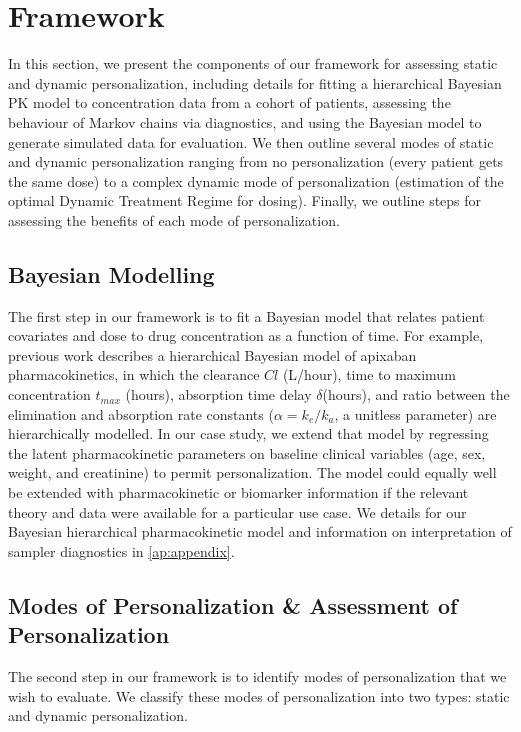 \section{Framework}\label{ss:framework}

In this section, we present the components of our framework for assessing static and dynamic personalization, including details for fitting a hierarchical Bayesian PK model to concentration data from a cohort of patients, assessing the behaviour of Markov chains via diagnostics, and using the Bayesian model to generate simulated data for evaluation. We then outline several modes of static and dynamic personalization ranging from no personalization (every patient gets the same dose) to a complex dynamic mode of personalization (estimation of the optimal Dynamic Treatment Regime for dosing).  Finally, we outline steps for assessing the benefits of each mode of personalization.

\subsection{Bayesian Modelling}

The first step in our framework is to fit a Bayesian model that relates patient covariates and dose to drug concentration as a function of time. For example, previous work \cite{pananos2020comparisons} describes a hierarchical Bayesian model of apixaban pharmacokinetics, in which the clearance $Cl$ (L/hour), time to maximum concentration $t_{max}$ (hours), absorption time delay $\delta$(hours), and ratio between the elimination and absorption rate constants ($\alpha = k_e/k_a$, a unitless parameter) are hierarchically modelled. In our case study, we extend that model by regressing the latent pharmacokinetic parameters on baseline clinical variables (age, sex, weight, and creatinine) to permit personalization. The model could equally well be extended with pharmacokinetic or biomarker information if the relevant theory and data were available for a particular use case. We details for our Bayesian hierarchical pharmacokinetic model and information on interpretation of sampler diagnostics in \cref{ap:appendix}.


\subsection{Modes of Personalization \& Assessment of Personalization}

The second step in our framework is to identify modes of personalization that we wish to evaluate. We classify these modes of personalization into two types: static and dynamic personalization.

